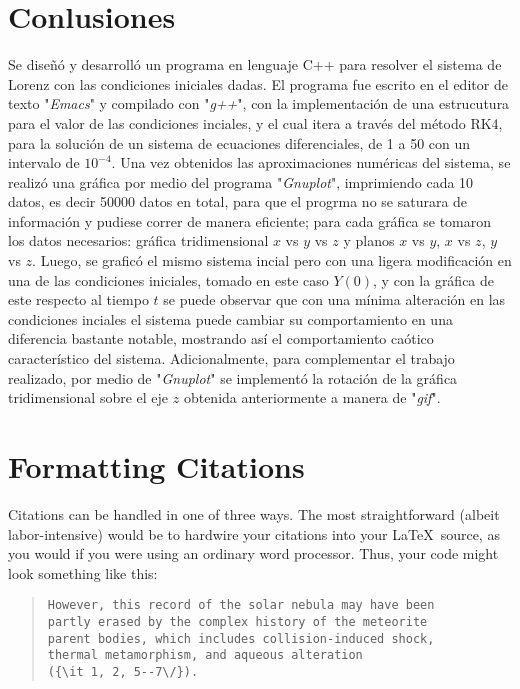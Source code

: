 \documentclass[letterpaper, 12pt]{article}
\begin{document}
{\section*{Conlusiones}

\justify
Se diseñ\'o y desarroll\'o un programa en lenguaje C++ para resolver el sistema de Lorenz con las condiciones iniciales dadas. El programa fue escrito en el editor de texto "\textit{Emacs}" y compilado con "\textit{g++}", con la implementaci\'on de una estrucutura para el valor de las condiciones inciales, y el cual itera a través del método RK4, para la soluci\'on de un sistema de ecuaciones diferenciales, de 1 a 50 con un intervalo de $10^{-4}$. Una vez obtenidos las aproximaciones num\'ericas del sistema, se realiz\'o una gr\'afica por medio del programa "\textit{Gnuplot}", imprimiendo cada 10 datos, es decir 50000 datos en total, para que el progrma no se saturara de informaci\'on y pudiese correr de manera eficiente; para cada gr\'afica se tomaron los datos necesarios: gr\'afica tridimensional $x$ vs $y$ vs $z$ y  planos $x$ vs $y$, $x$ vs $z$, $y$ vs $z$. Luego, se grafic\'o el mismo sistema incial pero con una ligera modificaci\'on en una de las condiciones iniciales, tomado en este caso $Y(0)$, y con la gr\'afica de este respecto al tiempo $t$ se puede observar que con una mínima alteraci\'on en las condiciones inciales el sistema puede cambiar su comportamiento en una diferencia bastante notable, mostrando as\'i el comportamiento ca\'otico caracter\'istico del sistema. Adicionalmente, para complementar el trabajo realizado, por medio de "\textit{Gnuplot}" se implement\'o la rotaci\'on de la gráfica tridimensional sobre el eje $z$  obtenida anteriormente a manera de "\textit{gif}".


\section*{Formatting Citations}

Citations can be handled in one of three ways.  The most
straightforward (albeit labor-intensive) would be to hardwire your
citations into your \LaTeX\ source, as you would if you were using an
ordinary word processor.  Thus, your code might look something like
this:


\begin{quote}
\begin{verbatim}
However, this record of the solar nebula may have been
partly erased by the complex history of the meteorite
parent bodies, which includes collision-induced shock,
thermal metamorphism, and aqueous alteration
({\it 1, 2, 5--7\/}).
\end{verbatim}
\end{quote}


}
\end{document}
